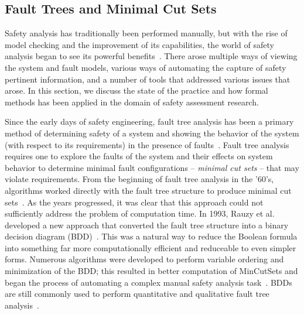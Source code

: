 \subsection{Fault Trees and Minimal Cut Sets}
\label{sec:saArtifacts}
 Safety analysis has traditionally been performed manually, but with the rise of model checking and the improvement of its capabilities, the world of safety analysis began to see its powerful benefits~\cite{hinchey2012industrial, liggesmeyer1998improving, coudert1993fault, Bozzano:2010:DSA:1951720,bozzano2003esacs}. There arose multiple ways of viewing the system and fault models, various ways of automating the capture of safety pertinent information, and a number of tools that addressed various issues that arose. In this section, we discuss the state of the practice and how formal methods has been applied in the domain of safety assessment research.

Since the early days of safety engineering, fault tree analysis has been a primary method of determining safety of a system and showing the behavior of the system (with respect to its requirements) in the presence of faults~\cite{0f356f05e72f43018211b36f97c8854a,vesely1981fault}. Fault tree analysis requires one to explore the faults of the system and their effects on system behavior to determine minimal fault configurations -- \emph{minimal cut sets} -- that may violate requirements. From the beginning of fault tree analysis in the '60's, algorithms worked directly with the fault tree structure to produce minimal cut sets~\cite{10020219108,semanderes1971elraft}. As the years progressed, it was clear that this approach could not sufficiently address the problem of computation time. In 1993, Rauzy et al. developed a new approach that converted the fault tree structure into a binary decision diagram (BDD)~\cite{rauzy1993new}. This was a natural way to reduce the Boolean formula into something far more computationally efficient and reduceable to even simpler forms. Numerous algorithms were developed to perform variable ordering and minimization of the BDD; this resulted in better computation of MinCutSets and began the process of automating a complex manual safety analysis task~\cite{sinnamon1997new,bryant1986graph,aralia1996computation,reay2002fault,rauzy2007assessment}. BDDs are still commonly used to perform quantitative and qualitative fault tree analysis~\cite{ge2015quantitative,jiang2018algebraic,banov2019new}.
